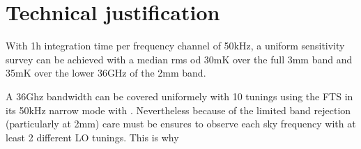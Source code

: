 \section{Technical justification}
With 1h integration time per frequency channel of 50kHz, a uniform sensitivity survey can be achieved with a median rms od 30mK over the full 3mm band and 35mK over the lower 36GHz of the 2mm band. 

A 36Ghz bandwidth can be covered uniformely with 10 tunings using the FTS in its 50kHz narrow mode with . Nevertheless because of the limited band rejection (particularly at 2mm) care must be ensures to observe each sky frequency with at least 2 different LO tunings. This is why 
   
  